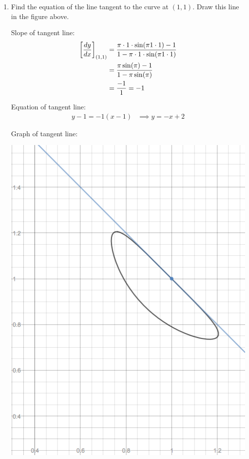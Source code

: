 \documentclass[nooutcomes]{ximera}
\begin{document}
\begin{problem}
\begin{enumerate}
    \item
      Find the equation of the line tangent to the curve at $(1,1)$.
      Draw this line in the figure above.
      \begin{freeResponse}
        Slope of tangent line:
        \begin{align*}
          \eval{\dd[y]{x}}_{(1,1)} &= \frac{\pi \cdot 1 \cdot\sin(\pi 1 \cdot 1) - 1}{1 - \pi \cdot 1 \cdot \sin(\pi 1 \cdot 1)} \\
          &= \frac{\pi\sin(\pi) - 1}{1 - \pi \sin(\pi)}\\
          &= \frac{-1}{1} = -1
        \end{align*}

        Equation of tangent line:
        \begin{align*}
          y - 1 = -1(x - 1) &\implies y = -x + 2
        \end{align*}

        Graph of tangent line:
        \begin{image}
          \includegraphics[scale = 0.5]{figure5.png}
        \end{image}
      \end{freeResponse}

  \end{enumerate}
\end{problem}
\end{document}
